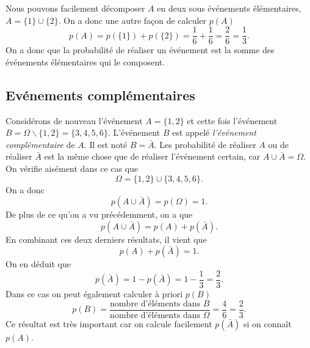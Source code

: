 \documentclass[a4paper,12pt]{book}
\begin{document}
Nous pouvons facilement décomposer $A$ en deux sous événements élémentaires, $A=\{1\}\cup \{2\}$.
On a donc une autre façon de calculer $p(A)$
\begin{equation}
p(A)=p(\{1\})+p(\{2\})=\frac{1}{6}+\frac{1}{6}=\frac{2}{6}=\frac{1}{3}.
\end{equation}
On a donc que la probabilité de réaliser un événement est la somme des événements élémentaires qui le composent.

\subsection{Evénements complémentaires}
Considérons de nouveau l'événement $A=\{1,2\}$ et cette fois l'événement $B=\Omega\backslash \{1,2\}=\{3,4,5,6\}$. L'événement 
$B$ est appelé \textit{l'événement complémentaire} de $A$. Il est noté $B=\bar A$. Les probabilité de réaliser $A$ ou de réaliser
$\bar A$ est la même chose que de réaliser l'événement certain, car $A\cup \bar A=\Omega$. 
On vérifie aisément dans ce cas que 
\begin{equation}
 \Omega=\{1,2\}\cup\{3,4,5,6\}.
\end{equation}
On a donc 
\begin{equation}
 p(A\cup \bar A)=p(\Omega)=1.
\end{equation}
De plus de ce qu'on a vu précédemment,
on a que 
\begin{equation}
p(A\cup \bar A)=p(A)+p(\bar A).
\end{equation}
En combinant ces deux derniers résultats, il vient que
\begin{equation}
p(A)+p(\bar A)=1.
\end{equation}
On en déduit que 
\begin{equation}
p(\bar A)=1-p(\bar A)=1-\frac{1}{3}=\frac{2}{3}.
\end{equation}
Dans ce cas on peut également calculer à priori $p(B)$
\begin{equation}
p(B)=\frac{\mbox{nombre d'éléments dans }B}{\mbox{nombre d'éléments dans }\Omega}=\frac{4}{6}=\frac{2}{3}.
\end{equation}
Ce résultat est très important car on calcule facilement $p(\bar A)$ si on connaît $p(A)$.
\end{document}
